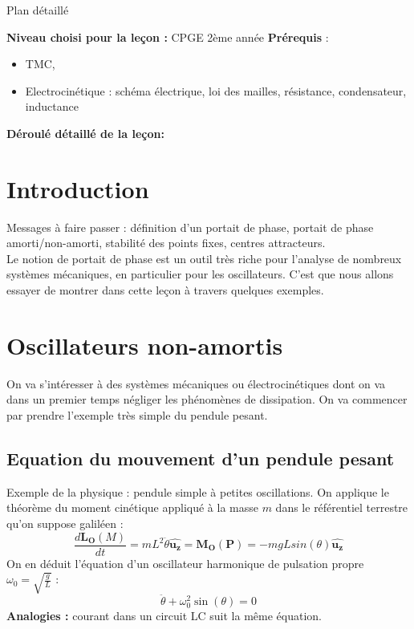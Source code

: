 \begin{reportBlock}{Plan détaillé}

  \textbf{Niveau choisi pour la leçon :} CPGE 2ème année
  \newline
  \textbf{Prérequis} : \begin{itemize}
      \item TMC,
      \item Electrocinétique : schéma électrique, loi des mailles, résistance, condensateur, inductance
  \end{itemize}

  \textbf{Déroulé détaillé de la leçon: }  
  
  \section*{Introduction}
Messages à faire passer : définition d'un portait de phase, portait de phase amorti/non-amorti, stabilité des points fixes, centres attracteurs.\\

Le notion de portait de phase est un outil très riche pour l'analyse de nombreux systèmes mécaniques, en particulier pour les oscillateurs. C'est que nous allons essayer de montrer dans cette leçon à travers quelques exemples.

  \section{Oscillateurs non-amortis}
  On va s'intéresser à des systèmes mécaniques ou électrocinétiques dont on va dans un premier temps négliger les phénomènes de dissipation. On va commencer par prendre l'exemple très simple du pendule pesant.
  \subsection{Equation du mouvement d'un pendule pesant}
  Exemple de la physique : pendule simple à petites oscillations. On applique le théorème du moment cinétique appliqué à la masse $m$ dans le référentiel terrestre qu'on suppose galiléen :
  \begin{equation}
     \frac{d\mathbf{L_O}(M)}{dt} = mL^2\ddot{\theta}\mathbf{\hat{u_z}} = \mathbf{M_O}(\mathbf{P}) = -mgLsin(\theta)\mathbf{\hat{u_z}}
  \end{equation}
  On en déduit l'équation d'un oscillateur harmonique de pulsation propre $\omega_0=\sqrt{\frac{g}{L}}$ :
  \begin{equation}
      \ddot{\theta} + \omega_0^2\sin(\theta) = 0
  \end{equation}
  \textbf{Analogies :} courant dans un circuit LC suit la même équation.

\end{reportBlock}
